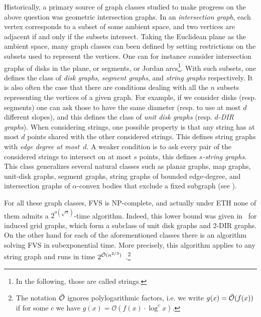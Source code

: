 \documentclass{amsart}
\DeclareMathOperator\TO{\Tilde{\O}}
\newcommand{\FVS}{\textsc{FVS}\xspace}
\renewcommand{\O}{\mathcal{O}}
\begin{document}
Historically, a primary source of graph classes studied to make progress on the above question was geometric intersection graphs.
In an \emph{intersection graph}, each vertex corresponds to a subset of some ambient space, and two vertices are adjacent if and only if the subsets intersect. Taking the Euclidean plane as the ambient space, many graph classes can been defined by setting restrictions on the subsets used to represent the vertices. One can for instance consider intersection graphs of disks in the plane, or segments, or Jordan arcs\footnote{In the following, those are called strings.}. With such subsets, one defines the class of {\em disk graphs}, {\em segment graphs}, and {\em string graphs} respectively. It is also often the case that there are conditions dealing with all the $n$ subsets representing the vertices of a given graph. For example, if we consider disks (resp. segments) one can ask those to have the same diameter (resp. to use at most $d$ different slopes), and this defines the class of {\em unit disk graphs} (resp. {\em $d$-DIR graphs}). When considering strings, one possible property is that any string has at most $d$ points shared with the other considered strings. This defines string graphs with {\em edge degree at most~$d$}. 
A weaker condition is to ask every pair of the considered strings to intersect on at most $s$ points, this defines {\em $s$-string graphs}.
This class generalizes several natural classes such as planar graphs, map graphs, unit-disk graphs, segment graphs, string graphs of bounded edge-degree, and intersection graphs of $\alpha$-convex bodies that exclude a fixed subgraph (see \cite{matouvsek2014string, kratochvil1994intersection, baste2022contraction}). 



For all these graph classes, \FVS is NP-complete, and actually under ETH none of them admits a $2^{o(\sqrt{n})}$-time algorithm. Indeed, this lower bound was given in~\cite{deberg_unit} for induced grid graphs, which form a subclass of unit disk graphs and 2-DIR graphs. On the other hand for each of the aforementioned classes there is an algorithm solving \FVS in subexponential time. More precisely, this algorithm applies to any string graph and runs in time $2^{\TO(n^{2/3})}$~\cite{bonnet2019optimality}.\footnote{The notation $\TO$ ignores polylogarithmic factors, i.e. we write $g(x) = \TO(f(x))$ if for some $c$ we have $g(x) = \O(f(x) \cdot \log^c x)$.}
\end{document}
